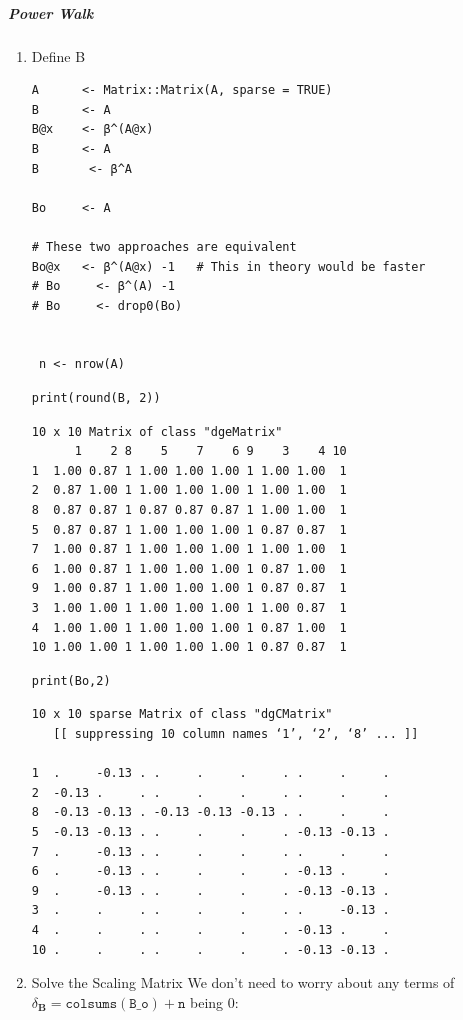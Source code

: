 \documentclass[11pt]{article}
\begin{document}
\subparagraph{Power Walk}
\label{sec:orgb5f82d9}
\begin{enumerate}
\item Define B
\label{sec:orga86874f}
\begin{verbatim}
A      <- Matrix::Matrix(A, sparse = TRUE)
B      <- A
B@x    <- β^(A@x)
B      <- A
B       <- β^A

Bo     <- A

# These two approaches are equivalent
Bo@x   <- β^(A@x) -1   # This in theory would be faster
# Bo     <- β^(A) -1
# Bo     <- drop0(Bo)


 n <- nrow(A)
\end{verbatim}

\begin{verbatim}
print(round(B, 2))
\end{verbatim}

\begin{verbatim}
10 x 10 Matrix of class "dgeMatrix"
      1    2 8    5    7    6 9    3    4 10
1  1.00 0.87 1 1.00 1.00 1.00 1 1.00 1.00  1
2  0.87 1.00 1 1.00 1.00 1.00 1 1.00 1.00  1
8  0.87 0.87 1 0.87 0.87 0.87 1 1.00 1.00  1
5  0.87 0.87 1 1.00 1.00 1.00 1 0.87 0.87  1
7  1.00 0.87 1 1.00 1.00 1.00 1 1.00 1.00  1
6  1.00 0.87 1 1.00 1.00 1.00 1 0.87 1.00  1
9  1.00 0.87 1 1.00 1.00 1.00 1 0.87 0.87  1
3  1.00 1.00 1 1.00 1.00 1.00 1 1.00 0.87  1
4  1.00 1.00 1 1.00 1.00 1.00 1 0.87 1.00  1
10 1.00 1.00 1 1.00 1.00 1.00 1 0.87 0.87  1
\end{verbatim}


\begin{verbatim}
print(Bo,2)
\end{verbatim}

\begin{verbatim}
10 x 10 sparse Matrix of class "dgCMatrix"
   [[ suppressing 10 column names ‘1’, ‘2’, ‘8’ ... ]]

1  .     -0.13 . .     .     .     . .     .     .
2  -0.13 .     . .     .     .     . .     .     .
8  -0.13 -0.13 . -0.13 -0.13 -0.13 . .     .     .
5  -0.13 -0.13 . .     .     .     . -0.13 -0.13 .
7  .     -0.13 . .     .     .     . .     .     .
6  .     -0.13 . .     .     .     . -0.13 .     .
9  .     -0.13 . .     .     .     . -0.13 -0.13 .
3  .     .     . .     .     .     . .     -0.13 .
4  .     .     . .     .     .     . -0.13 .     .
10 .     .     . .     .     .     . -0.13 -0.13 .
\end{verbatim}

\item Solve the Scaling Matrix
\label{sec:org17b5940}
We don't need to worry about any terms of \(\delta_{\mathbf{B}} = \mathtt{colsums\left(B\_o\right)+n}\) being 0:


\end{enumerate}
\end{document}
